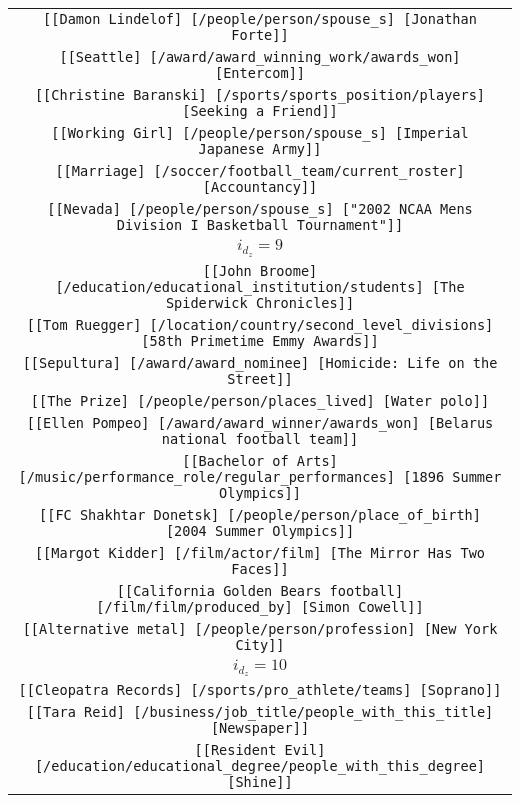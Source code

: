 \begin{longtable}{|c|}
    \texttt{[[Damon Lindelof] [/people/person/spouse\_s] [Jonathan Forte]]}\\
    \texttt{[[Seattle] [/award/award\_winning\_work/awards\_won] [Entercom]]}\\
    \texttt{[[Christine Baranski] [/sports/sports\_position/players] [Seeking a Friend]]}\\
    \texttt{[[Working Girl] [/people/person/spouse\_s] [Imperial Japanese Army]]}\\
    \texttt{[[Marriage] [/soccer/football\_team/current\_roster] [Accountancy]]}\\
    \texttt{[[Nevada] [/people/person/spouse\_s] ["2002 NCAA Mens Division I Basketball Tournament"]]}\\
    \hline 
    \rowcolor[HTML]{EFEFEF} 
    \textsc{$i_{d_z}=9$}\\ \hline 
    \texttt{[[John Broome] [/education/educational\_institution/students] [The Spiderwick Chronicles]]}\\
    \texttt{[[Tom Ruegger] [/location/country/second\_level\_divisions] [58th Primetime Emmy Awards]]}\\
    \texttt{[[Sepultura] [/award/award\_nominee] [Homicide: Life on the Street]]}\\
    \texttt{[[The Prize] [/people/person/places\_lived] [Water polo]]}\\
    \texttt{[[Ellen Pompeo] [/award/award\_winner/awards\_won] [Belarus national football team]]}\\
    \texttt{[[Bachelor of Arts] [/music/performance\_role/regular\_performances] [1896 Summer Olympics]]}\\
    \texttt{[[FC Shakhtar Donetsk] [/people/person/place\_of\_birth] [2004 Summer Olympics]]}\\
    \texttt{[[Margot Kidder] [/film/actor/film] [The Mirror Has Two Faces]]}\\
    \texttt{[[California Golden Bears football] [/film/film/produced\_by] [Simon Cowell]]}\\
    \texttt{[[Alternative metal] [/people/person/profession] [New York City]]}\\
    \hline 
    \rowcolor[HTML]{EFEFEF} 
    \textsc{$i_{d_z}=10$}\\ \hline 
    \texttt{[[Cleopatra Records] [/sports/pro\_athlete/teams] [Soprano]]}\\
    \texttt{[[Tara Reid] [/business/job\_title/people\_with\_this\_title] [Newspaper]]}\\
    \texttt{[[Resident Evil] [/education/educational\_degree/people\_with\_this\_degree] [Shine]]}\\

\end{longtable}

